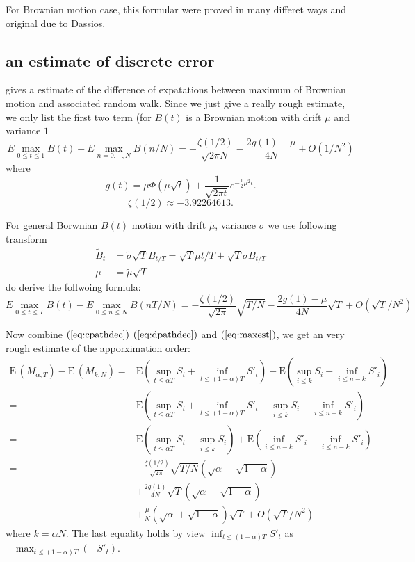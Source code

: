 \documentclass[11pt]{book}
\def\tB{{\widetilde{B}}}
\def\tmu{{\widetilde{\mu}}}
\def\tsigma{{\widetilde{\sigma}}}
\def\E{{\mathrm{E}\,}}
\def\EE#1{{{\mathrm{E}}\left(#1\right)}}
\begin{document}
For Brownian motion case, this formular were proved in many differet ways
and original due to Dassios\cite{Dassios1995}. 

\subsection{an estimate of discrete error}
\cite{Janssen2008} gives a estimate of the difference of  expatations 
between maximum of Brownian motion and associated random walk. 
Since we just give a really rough estimate, we only list the first two term
(for $B(t)$ is a Brownian motion with drift $\mu$ and variance $1$
\begin{equation}\label{eq:est1}
E\max_{0\leq t \leq 1} B(t) - E\max_{n=0,\cdots, N}B(n/N) 
= -\frac{\zeta(1/2)}{\sqrt{2\pi N}}-\frac{2g(1)-\mu}{4N} + O(1/N^2)
\end{equation}
where 
\[
g(t) = \mu \Phi(\mu \sqrt{t}) + \frac{1}{\sqrt{2\pi t}} e^{-\frac{1}{2}\mu^2 t}.
\]
\[
\zeta(1/2) \approx -3.92264613.
\]

For general Borwnian $\tB(t)$ motion with drift $\tmu$, variance $\tsigma$
we use following transform
\begin{align*}
\tB_t &= \tsigma\sqrt{T} B_{t/T} = \sqrt{T} \mu t/T + \sqrt{T}\sigma B_{t/T}\\
\mu &= \tmu \sqrt{T} 
\end{align*}
do derive the follwoing formula:
\begin{equation}\label{eq:maxest}
E\max_{0\leq t\leq T} B(t) - E \max_{0\leq n \leq N} B(nT/N) = 
 -\frac{\zeta(1/2)}{\sqrt{2\pi}}\sqrt{T/N}-\frac{2g(1)-\mu}{4N}\sqrt{T} + 
O(\sqrt{T}/N^2)
\end{equation}

Now combine $(\ref{eq:cpathdec})$ $(\ref{eq:dpathdec})$ and $(\ref{eq:maxest})$,
we get an very rough estimate of the apporximation order:
\begin{equation}
\begin{split}
\E (M_{\alpha,T}) - \E (M_{k,N})
=& \EE{\sup_{t\leq \alpha{T}} S_t +\inf_{t \leq (1-\alpha)T}S'_t} 
- \EE{\sup_{i\leq k} S_i+\inf_{i\leq n-k} S'_i}\\
=& \EE{\sup_{t\leq \alpha{T}} S_t +\inf_{t \leq (1-\alpha)T}S'_t
-  \sup_{i\leq k} S_i-\inf_{i\leq n-k} S'_i} \\
= &  \EE{\sup_{t\leq \alpha{T}} S_t - \sup_{i\leq k} S_i} +
\EE{\inf_{i\leq n-k} S'_i-\inf_{i\leq n-k} S'_i}\\
=& -\frac{\zeta(1/2)}{\sqrt{2\pi}}\sqrt{T/N} 
\left(\sqrt{\alpha} - \sqrt{1-\alpha}\right) \\
& + \frac{2g(1)}{4N}\sqrt{T}\left(\sqrt{\alpha} - \sqrt{1-\alpha}\right) \\
& + \frac{\mu}{N}\left(\sqrt{\alpha}+\sqrt{1-\alpha}\right)\sqrt{T}
 + O(\sqrt{T}/N^2) 
\end{split}
\end{equation}
where $k = \alpha N$.
The last equality holds by view $\inf_{t\leq (1-\alpha)T} S'_t$ as 
$-\max_{t\leq (1-\alpha)T} (-S'_t)$.
\end{document}
